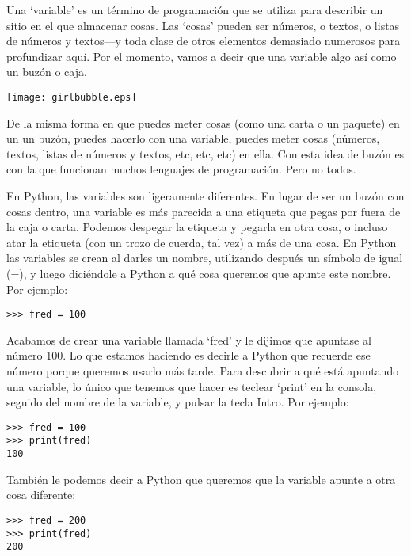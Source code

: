 Una `variable' es un término de programación que se utiliza para describir un sitio en el que almacenar cosas. Las `cosas' pueden ser números, o textos, o listas de números y textos---y toda clase de otros elementos demasiado numerosos para profundizar aquí. Por el momento, vamos a decir que una variable algo así como un buzón o caja.

\begin{center}
\texttt{[image: girlbubble.eps]}
\end{center}

De la misma forma en que puedes meter cosas (como una carta o un paquete) en un un buzón, puedes hacerlo con una variable, puedes meter cosas (números, textos, listas de números y textos, etc, etc, etc) en ella. Con esta idea de buzón es con la que funcionan muchos lenguajes de programación. Pero no todos.

En Python, las variables son ligeramente diferentes. En lugar de ser un buzón con cosas dentro, una variable es más parecida a una etiqueta que pegas por fuera de la caja o carta. Podemos despegar la etiqueta y pegarla en otra cosa, o incluso atar la etiqueta (con un trozo de cuerda, tal vez) a más de una cosa. En Python las variables se crean al darles un nombre, utilizando después un símbolo de igual (=), y luego diciéndole a Python a qué cosa queremos que apunte este nombre. Por ejemplo:

\begin{listing}
\begin{verbatim}
>>> fred = 100
\end{verbatim}
\end{listing}

Acabamos de crear una variable llamada `fred' y le dijimos que apuntase al número 100. Lo que estamos haciendo es decirle a Python que recuerde ese número porque queremos usarlo más tarde. Para descubrir a qué está apuntando una variable, lo único que tenemos que hacer es teclear `print' en la consola, seguido del nombre de la variable, y pulsar la tecla Intro. Por ejemplo:

\begin{listing}
\begin{verbatim}
>>> fred = 100
>>> print(fred)
100
\end{verbatim}
\end{listing}

También le podemos decir a Python que queremos que la variable  apunte a otra cosa diferente:

\begin{listing}
\begin{verbatim}
>>> fred = 200
>>> print(fred)
200
\end{verbatim}
\end{listing}

